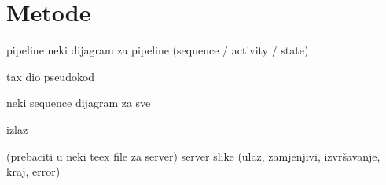 \chapter{Metode}
\label{chap:metode}

pipeline neki dijagram za pipeline (sequence / activity / state)

tax dio pseudokod

neki sequence dijagram za sve

izlaz

(prebaciti u neki teex file za server) server slike (ulaz, zamjenjivi, izvršavanje, kraj, error)

